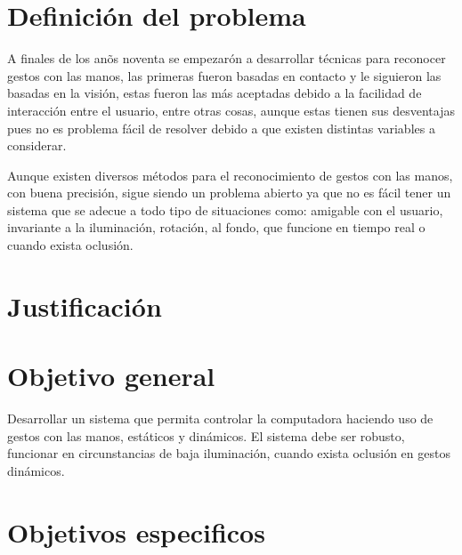 \section{Definici\'on del problema}\label{DefinicionProblema}

A finales de los an\~os noventa se empezar\'on a desarrollar t\'ecnicas para reconocer gestos con las manos, las primeras fueron basadas en contacto y le siguieron las basadas en la visión, estas fueron las m\'as aceptadas debido a la facilidad de interacción entre el usuario, entre otras cosas, aunque estas tienen sus desventajas pues no es problema fácil de resolver debido a que existen distintas variables a considerar.

Aunque existen diversos m\'etodos para el reconocimiento de gestos con las manos, con buena precisi\'on, sigue siendo un problema abierto ya que no es f\'acil tener un sistema que se adecue a todo tipo de situaciones como: amigable con el usuario, invariante a la iluminación, rotación, al fondo, que funcione en tiempo real o cuando exista oclusión.


\section{Justificaci\'on}\label{Just}



\section{Objetivo general}\label{ObjetivoGeneral}
 
Desarrollar un sistema que permita controlar la computadora haciendo uso de gestos con las manos, estáticos y dinámicos. El sistema debe ser robusto, funcionar en circunstancias de baja iluminación, cuando exista oclusión en gestos dinámicos.

\section{Objetivos especificos}\label{bjetivosEspecificos}

